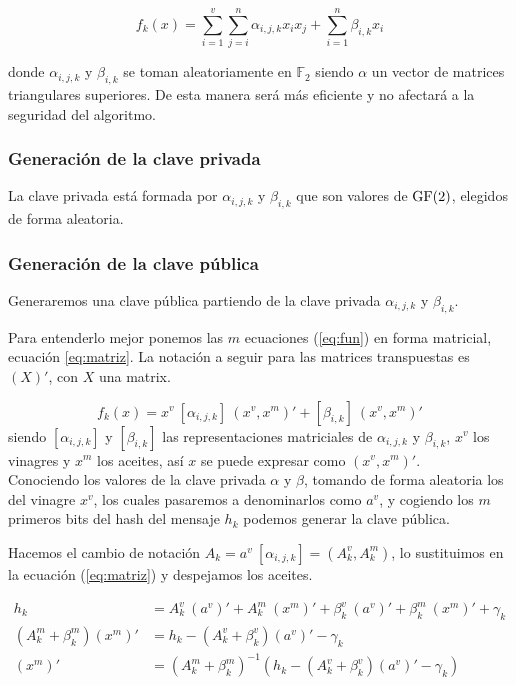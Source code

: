 \begin{equation}\label{eq:fun}
f_k(x) = \sum_{i=1}^v \sum_{j=i}^n \alpha_{i,j,k} x_i x_j + \sum_{i=1}^n \beta_{i,k} x_i
\end{equation}

donde $\alpha_{i,j,k}$ y $\beta_{i,k}$ se toman aleatoriamente en $\mathds{F}_2$ siendo $\alpha$ un vector de matrices triangulares superiores. De esta manera será más eficiente y no afectará a la seguridad del algoritmo.



\subsubsection{Generación de la clave privada}
La clave privada está formada por $\alpha_{i,j,k}$ y $\beta_{i,k}$ que son valores de $\operatorname{GF}(2)$, elegidos de forma aleatoria.


\subsubsection{Generación de la clave pública}
Generaremos una clave pública partiendo de la clave privada $\alpha_{i,j,k}$ y $\beta_{i,k}$.

Para entenderlo mejor ponemos las $m$ ecuaciones (\ref{eq:fun}) en forma matricial, ecuación \ref{eq:matriz}. La notación a seguir para las matrices transpuestas es $(X)'$, con $X$ una matrix.

\begin{equation}\label{eq:matriz} 
f_k(x) = x^v\ [\alpha_{i,j,k}]\ (x^v, x^m)' + [\beta_{i,k}]\ (x^v, x^m)'
\end{equation}
siendo $[\alpha_{i,j,k}]$ y $[\beta_{i,k}]$ las representaciones matriciales de $\alpha_{i,j,k}$ y $\beta_{i,k}$, $x^v$ los vinagres y $x^m$ los aceites, así $x$ se puede expresar como $(x^v, x^m)'$.\\

Conociendo los valores de la clave privada $\alpha$ y $\beta$, tomando de forma aleatoria los del vinagre $x^v$, los cuales pasaremos a denominarlos como $a^v$, y cogiendo los $m$ primeros bits del hash del mensaje $h_k$ podemos generar la clave pública.

Hacemos el cambio de notación $A_k = a^v\ [\alpha_{i,j,k}] = (A^v_k, A^m_k)$,  lo sustituimos en la ecuación (\ref{eq:matriz}) y despejamos los aceites.

\begin{align}
h_k &= A_k^v\ (a^v)' +  A_k^m\ (x^m)' + \beta_k^v\ (a^v)' + \beta_k^m\ (x^m)' + \gamma_k\\
(A_k^m + \beta_k^m) (x^m)' &= h_k - (A_k^v + \beta_k^v) (a^v)' -\gamma_k\\
\label{eq:despeje}
(x^m)' &= (A_k^m + \beta_k^m)^{-1} (h_k - (A_k^v + \beta_k^v) (a^v)' -\gamma_k)
\end{align}

